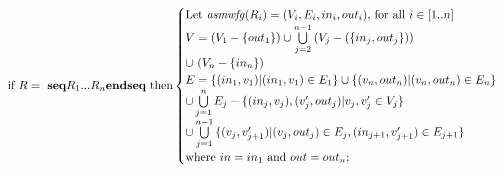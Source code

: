 \begin{equation*}
	\text{if $R = \ \textbf{seq} R_1 ... R_n \textbf{endseq}$ then}
	\begin{cases}
			\text{Let \textit{asmwfg}$(R_i) = (V_i, E_i, in_i, out_i)$, for all $i \in [1..n]$}\\
			\text{$V = (V_1 - \{out_1\}) \cup \bigcup \limits_{j=2}^{n-1}{(V_j - (\{in_j, out_j\}))}$}\\
			\text{$\cup \ (V_n - \{in_n\})$}\\
			\text{$E = \{(in_1, v_1) | (in_1, v_1) \in E_1\} \cup \{(v_n, out_n) | (v_n, out_n) \in E_n\}$}\\
			\text{$\cup \bigcup \limits_{j=1}^{n}{E_j - \{(in_j, v_j), (v_j', out_j) | v_j, v_j' \in V_j\}} $}\\
			\text{$\cup \bigcup \limits_{j=1}^{n-1}{\{(v_j, v_{j+1}') | (v_j, out_j) \in E_j, (in_{j+1}, v_{j+1}') \in E_{j+1}\}} $}\\
			\text{where $in = in_1$ and $out = out_n$;}\\
	\end{cases}
\end{equation*}





		










